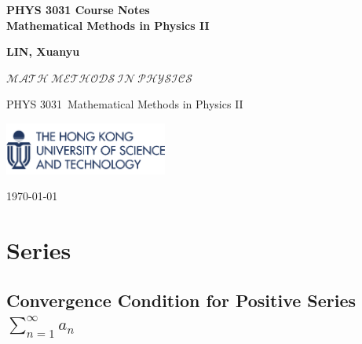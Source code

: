 \documentclass[10pt]{article}
\newcommand\course{PHYS 3031}
\begin{document}
	

\begin{titlepage}
	\begin{center}
		\vspace*{3cm}
		
		\Huge
		\hrulefill
		\vspace{1cm}
		
		\huge
		\textbf{PHYS 3031 Course Notes\\}
		\vspace{1cm}
		\textbf{Mathematical Methods in Physics II}
		\vspace{1cm}
		
		\hrulefill
		
		\vspace{1.5cm}
		\Large

		\textbf{LIN, Xuanyu}
		
		\vfill
		
		$\mathscr{MATH\ METHODS\ IN\ PHYSICS}$
		
		\vspace{1cm}
		
		\course \ Mathematical Methods in Physics II
		
		\vspace{1cm}
		
		\includegraphics[width=0.4\textwidth]{logo-hkust.png}
		\\
		
		\Large
		
		\today
		
	\end{center}
\end{titlepage}


\tableofcontents

\newpage

\section{Series}

\subsection[Convergence Condition for Positive Series]{Convergence Condition for Positive Series $\sum\limits_{n=1}^{\infty} a_n$}
\end{document}
